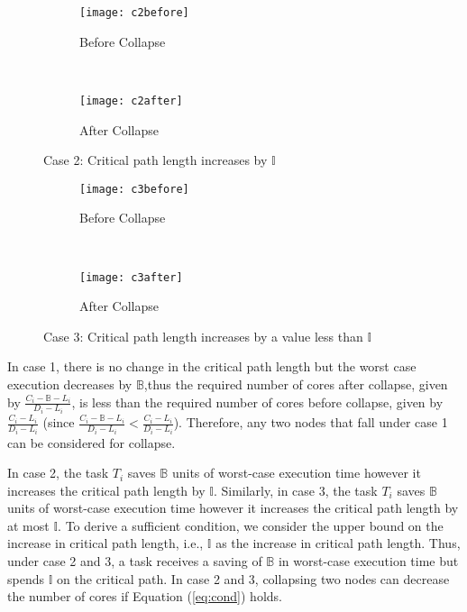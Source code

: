 \begin{figure}
  \centering
  \begin{subfigure}[b]{0.4\textwidth}{
      \texttt{[image: c2before]}
      \caption{Before Collapse}
      \label{fig:c2before}
    }
  \end{subfigure}~
  \begin{subfigure}[b]{0.4\textwidth}{
      \texttt{[image: c2after]}
      \caption{After Collapse}
      \label{fig:c2after}
    }
  \end{subfigure}
  \caption{Case 2:  Critical path length increases by $\mathbb{I}$}
  \label{fig:c2}
\end{figure}

\begin{figure}
  \centering
  \begin{subfigure}[b]{0.4\textwidth}{
      \texttt{[image: c3before]}
      \caption{Before Collapse}
      \label{fig:c2before}
    }
  \end{subfigure}~
  \begin{subfigure}[b]{0.4\textwidth}{
      \texttt{[image: c3after]}
      \caption{After Collapse}
      \label{fig:c2after}
    }
  \end{subfigure}
  \caption{Case 3:  Critical path length increases by a value less than $\mathbb{I}$}
  \label{fig:c3}
\end{figure}

In case 1, there is no change in the critical path length but the worst case execution decreases by $\mathbb{B}$,thus the required number of cores after collapse, given by $\frac{C_i - \mathbb{B} - L_i}{D_i - L_i}$, is less than the required number of cores before collapse, given by $\frac{C_i - L_i}{D_i - L_i}$  (since $\frac{C_i - \mathbb{B} - L_i}{D_i - L_i} < \frac{C_i - L_i}{D_i - L_i}$). Therefore, any two nodes that fall under case 1 can be considered for collapse. 

In case 2, the task $T_i$ saves $\mathbb{B}$ units of worst-case execution time however it increases the critical path length by $\mathbb{I}$. Similarly, in case 3, the task $T_i$ saves $\mathbb{B}$ units of worst-case execution time however it increases the critical path length by at most $\mathbb{I}$. To derive a sufficient condition, we consider the upper bound on the increase in critical path length, i.e., $\mathbb{I}$ as the increase in critical path length. Thus, under case 2 and 3, a task receives a saving of $\mathbb{B}$ in worst-case execution time but spends $\mathbb{I}$ on the critical path. In case 2 and 3, collapsing two nodes can decrease the number of cores if Equation (\ref{eq:cond}) holds.

